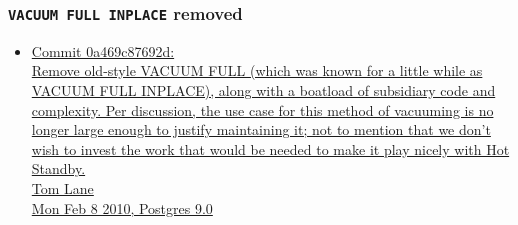%
%
%

\begin{frame}
  \frametitle{\texttt{VACUUM FULL INPLACE} removed}
  \begin{itemize}
    \item {\linksize \href{https://git.postgresql.org/cgit/postgresql.git/commit/?id=0a469c87692d15a22eaa69d4b3a43dd8e278dd64}
      {Commit 0a469c87692d: \faExternalLink \\
      Remove old-style VACUUM FULL (which was known for a little while as
      VACUUM FULL INPLACE), along with a boatload of subsidiary code and complexity.
      Per discussion, the use case for this method of vacuuming is no longer large
      enough to justify maintaining it; not to mention that we don't wish to invest
      the work that would be needed to make it play nicely with Hot Standby. \\
      Tom Lane \\
      Mon Feb 8 2010, Postgres 9.0}}
  \end{itemize}
\end{frame}

